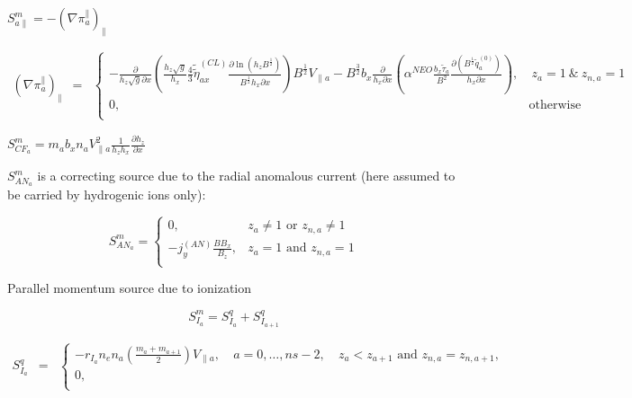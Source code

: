 \documentclass[a4paper,10pt]{report}
\begin{document}
$S_{a \parallel}^m = - \left( \nabla \pi_a^{\parallel} \right)_{\parallel}$

\begin{equation}
\begin{matrix}
\left( \nabla \pi_a^{\parallel} \right)_{\parallel} & =
& \left\{
\begin{matrix}
- \frac{\partial}{h_z\sqrt g\partial x}
\left(\frac{h_z\sqrt g}{h_x} \frac 4 3 \widetilde{\widetilde{\eta}}^{(CL)}_{ax}
\frac{\partial \ln \left( h_z B^{\frac 1 2} \right) }{B^{\frac 1 2} h_x \partial x}\right)
B^{\frac 1 2} V_{\parallel a} -
B^{\frac 3 2} b_x \frac{\partial}{h_x \partial x}
\left( \alpha^{NEO} \frac{b_x \tilde {\tau}_a}{B^2} \frac{\partial \left(B^{\frac 1 2} \tilde q_a^{(0)} \right)}{h_x \partial x}\right),
& \ z_a = 1~\&~z_{n,a} = 1 \\
0, & \mbox{otherwise} \\
\end{matrix} \right.
\end{matrix}
\end{equation}

$S_{CF_a}^m = m_a b_x n_a V_{\parallel a}^2 \frac 1{h_z h_x} \frac{\partial h_z}{\partial x}$

$S_{AN_a}^m$ is a correcting source due to the radial anomalous current (here assumed to be carried by hydrogenic ions only):

\begin{equation*}
S_{AN_a}^m = \left\{
\begin{matrix}
0, & z_a \ne 1 \mbox{ or } z_{n,a} \ne 1 \\
- j_y^{(AN)} \frac{B B_x}{B_z}, & z_a = 1 \mbox{ and } z_{n,a} = 1 \\
\end{matrix}
\right.
\end{equation*}

Parallel momentum source due to ionization

\begin{equation*}
S_{I_a}^m = S_{I_a}^q + S_{I_{a+1}}^q
\end{equation*}

\begin{equation}
\begin{matrix}
S_{I_a}^q & =
& \left\{
\begin{matrix}
-r_{I_a} n_e n_a \left( \frac{m_a+m_{a+1}}2 \right) V_{\parallel a}, & \ a=0,\ldots,ns-2, & \ z_a < z_{a+1} \mbox{ and } z_{n,a} = z_{n,a+1}, \\
0, \\
\end{matrix} \right.
\end{matrix}
\end{equation}
\end{document}

